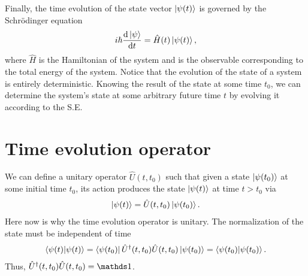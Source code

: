 Finally, the time evolution of the state vector $\ket{\psi(t)}$ is governed by the Schr\"{o}dinger equation
\begin{eqnarray}
    i\hbar \dv{\ket{\psi}}{t} = \hat{H}(t) \ket{\psi(t)}
,\end{eqnarray}
where $\hat{H}$ is the Hamiltonian of the system and is the observable corresponding to the total energy of the system.
Notice that the evolution of the state of a system is entirely deterministic.
Knowing the result of the state at some time $t_0$, we can determine the system's state at some arbitrary future time $t$ by evolving it according to the S.E.


\section{Time evolution operator}

We can define a unitary operator $\hat{U}(t,t_0)$ such that given a state $\ket{\psi(t_0)}$ at some initial time $t_0$, its action produces the state $\ket{\psi(t)}$ at time $t > t_0$ via
\begin{eqnarray}
    \ket{\psi(t)} = \hat{U}(t,t_0) \ket{\psi(t_0)}
.\end{eqnarray}
Here now is why the time evolution operator is unitary.
The normalization of the state must be independent of time
\begin{eqnarray}
    \bra{\psi(t)} \ket{\psi(t)} = \bra{\psi(t_0)} \hat{U}^{\dagger}(t,t_0) \hat{U}(t,t_0) \ket{\psi(t_0)} = \bra{\psi(t_0)} \ket{\psi(t_0)}
.\end{eqnarray}
Thus, $\hat{U}^{\dagger}(t,t_0) \hat{U}(t,t_0) = \id$.








